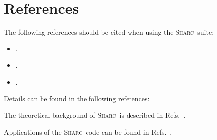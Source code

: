 \documentclass[a4paper,10pt,DIV=15,openany,twoside=false]{scrbook}
\newcommand{\sharc}{\textsc{Sharc}}
\begin{document}

\section{References}

The following references should be cited when using the \sharc\ suite:
{
\newcommand{\enquote}[1]{``#1''}
\begin{shaded}
  \begin{itemize}
    \item \cite{Richter2011JCTC} .
    \item \cite{Mai2015IJQC} .
    \item \cite{Mai2014SHARC} .
  \end{itemize}
\end{shaded}
}

Details can be found in the following references:

The theoretical background of \sharc\ is described in Refs.~\cite{Richter2011JCTC, Richter2012JCTC_erratum, Bajo2012JPCA, Marquetand2011FD, Mai2015IJQC}.

Applications of the \sharc\ code can be found in Refs.~\cite{Richter2012JPCL, Mai2013C, Mai2014TCC, Mai2014JCP_SO2, Gonzalez2014, add_applications_todo}.
\end{document}
